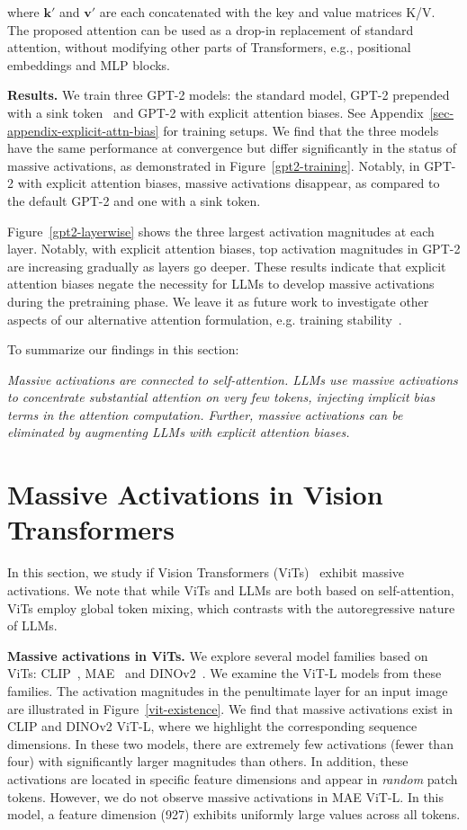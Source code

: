 where $\mathbf{k'}$ and $\mathbf{v'}$ are each concatenated with the key and value matrices K/V. The proposed attention can be used as a drop-in replacement of standard attention, without modifying other parts of Transformers, e.g., positional embeddings and MLP blocks.  

\textbf{Results.} We train three GPT-2 models: the standard model, GPT-2 prepended with a sink token~\citep{xiao2023sink} and GPT-2 with explicit attention biases. See Appendix~\ref{sec-appendix-explicit-attn-bias} for training setups. We find that the three models have the same performance at convergence but differ significantly in the status of massive activations, as demonstrated in Figure~\ref{gpt2-training}. Notably, in GPT-2 with explicit attention biases, massive activations disappear, as compared to the default GPT-2 and one with a sink token. 

Figure~\ref{gpt2-layerwise} shows the three largest activation magnitudes at each layer. Notably, with explicit attention biases, top activation magnitudes in GPT-2 are increasing gradually as layers go deeper. These results indicate that explicit attention biases negate the necessity for LLMs to develop massive activations during the pretraining phase. We leave it as future work to investigate other aspects of our alternative attention formulation, e.g. training stability~\citep{wortsman2023proxy}.

To summarize our findings in this section:

\textit{Massive activations are connected to self-attention. LLMs  use massive activations to concentrate substantial attention on very few tokens, injecting implicit bias terms in the attention computation. Further, massive activations can be eliminated by augmenting LLMs with explicit attention biases.}

\section{Massive Activations in Vision Transformers}\label{sec-vit}
In this section, we study if Vision Transformers (ViTs)~\citep{Dosovitskiy2021vit} exhibit massive activations. We note that while ViTs and LLMs are both based on self-attention, ViTs employ global token mixing, which contrasts with the autoregressive nature of LLMs.

\textbf{Massive activations in ViTs.} We explore several model families based on ViTs: CLIP~\citep{radford2021clip}, MAE~\citep{he2021mae} and DINOv2~\citep{oquab2024dinov2}. We examine the ViT-L models from these families. The activation magnitudes in the penultimate layer for an input image are illustrated in Figure~\ref{vit-existence}. We find that massive activations exist in CLIP and DINOv2 ViT-L, where we highlight the corresponding sequence dimensions. In these two models, there are extremely few activations (fewer than four) with significantly larger magnitudes than others. In addition, these activations are located in specific feature dimensions and appear in \textit{random} patch tokens. However, we do not observe massive activations in MAE ViT-L. In this model, a feature dimension (927) exhibits uniformly large values across all tokens.

